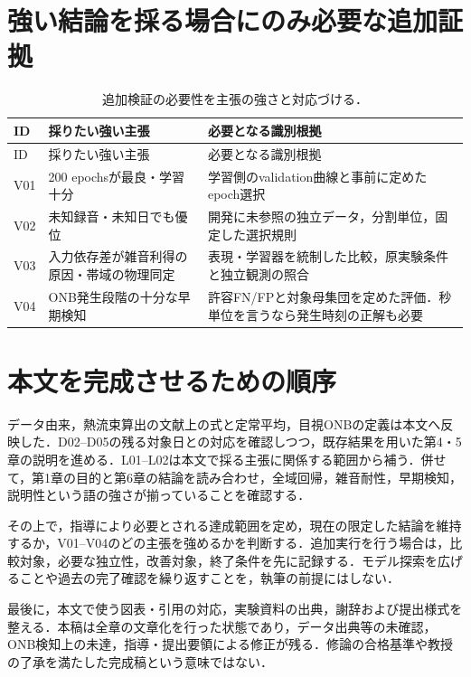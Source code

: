 \section{強い結論を採る場合にのみ必要な追加証拠}
\begin{longtable}{L{13mm}L{45mm}L{71mm}}
\caption{追加検証の必要性を主張の強さと対応づける．}\\
\toprule ID & 採りたい強い主張 & 必要となる識別根拠 \\ \midrule\endfirsthead
\toprule ID & 採りたい強い主張 & 必要となる識別根拠 \\ \midrule\endhead
V01 & 200 epochsが最良・学習十分 & 学習側のvalidation曲線と事前に定めたepoch選択 \\
V02 & 未知録音・未知日でも優位 & 開発に未参照の独立データ，分割単位，固定した選択規則 \\
V03 & 入力依存差が雑音利得の原因・帯域の物理同定 & 表現・学習器を統制した比較，原実験条件と独立観測の照合 \\
V04 & ONB発生段階の十分な早期検知 & 許容FN/FPと対象母集団を定めた評価．秒単位を言うなら発生時刻の正解も必要 \\
\bottomrule
\end{longtable}

\section{本文を完成させるための順序}
データ由来，熱流束算出の文献上の式と定常平均，目視ONBの定義は本文へ反映した．D02--D05の残る対象日との対応を確認しつつ，既存結果を用いた第4・5章の説明を進める．L01--L02は本文で採る主張に関係する範囲から補う．併せて，第1章の目的と第6章の結論を読み合わせ，全域回帰，雑音耐性，早期検知，説明性という語の強さが揃っていることを確認する．

その上で，指導により必要とされる達成範囲を定め，現在の限定した結論を維持するか，V01--V04のどの主張を強めるかを判断する．追加実行を行う場合は，比較対象，必要な独立性，改善対象，終了条件を先に記録する．モデル探索を広げることや過去の完了確認を繰り返すことを，執筆の前提にはしない．

最後に，本文で使う図表・引用の対応，実験資料の出典，謝辞および提出様式を整える．本稿は全章の文章化を行った状態であり，データ出典等の未確認，ONB検知上の未達，指導・提出要領による修正が残る．修論の合格基準や教授の了承を満たした完成稿という意味ではない．

